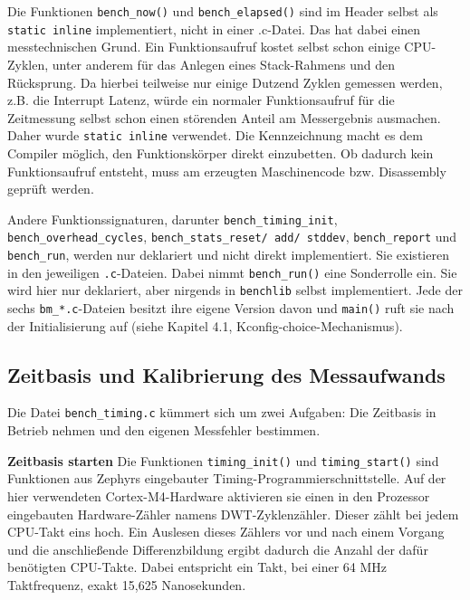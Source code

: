 Die Funktionen \lstinline[style=codeinline]|bench_now()| und \lstinline[style=codeinline]|bench_elapsed()| sind im Header selbst als \lstinline[style=codeinline]|static inline| implementiert, nicht in einer .c-Datei. Das hat dabei einen messtechnischen Grund. Ein Funktionsaufruf kostet selbst schon einige CPU-Zyklen, unter anderem f{\"u}r das Anlegen eines Stack-Rahmens und den R{\"u}cksprung. Da hierbei teilweise nur einige Dutzend Zyklen gemessen werden, z.B. die Interrupt Latenz, w{\"u}rde ein normaler Funktionsaufruf f{\"u}r die Zeitmessung selbst schon einen st{\"o}renden Anteil am Messergebnis ausmachen. Daher wurde \lstinline[style=codeinline]|static inline| verwendet. Die Kennzeichnung macht es dem Compiler m{\"o}glich, den Funktionsk{\"o}rper direkt einzubetten. Ob dadurch kein Funktionsaufruf entsteht, muss am erzeugten Maschinencode bzw. Disassembly gepr{\"u}ft werden.

Andere Funktionssignaturen, darunter \lstinline[style=codeinline]|bench_timing_init|, \lstinline[style=codeinline]|bench_overhead_cycles|, \lstinline[style=codeinline]|bench_stats_reset/ add/ stddev|, \lstinline[style=codeinline]|bench_report| und \lstinline[style=codeinline]|bench_run|, werden nur deklariert und nicht direkt implementiert. Sie existieren in den jeweiligen \lstinline[style=codeinline]|.c|-Dateien. Dabei nimmt \lstinline[style=codeinline]|bench_run()| eine Sonderrolle ein. Sie wird hier nur deklariert, aber nirgends in \lstinline[style=codeinline]|benchlib| selbst implementiert. Jede der sechs \lstinline[style=codeinline]|bm_*.c|-Dateien besitzt ihre eigene Version davon und \lstinline[style=codeinline]|main()| ruft sie nach der Initialisierung auf (siehe Kapitel 4.1, Kconfig-choice-Mechanismus).

\subsection{Zeitbasis und Kalibrierung des Messaufwands}
Die Datei \lstinline[style=codeinline]|bench_timing.c| k{\"u}mmert sich um zwei Aufgaben: Die Zeitbasis in Betrieb nehmen und den eigenen Messfehler bestimmen.

\textbf{Zeitbasis starten }Die Funktionen \lstinline[style=codeinline]|timing_init()| und \lstinline[style=codeinline]|timing_start()| sind Funktionen aus Zephyrs eingebauter Timing-Programmierschnittstelle. Auf der hier verwendeten Cortex-M4-Hardware aktivieren sie einen in den Prozessor eingebauten Hardware-Z{\"a}hler namens DWT-Zyklenz{\"a}hler. Dieser z{\"a}hlt bei jedem CPU-Takt eins hoch. Ein Auslesen dieses Z{\"a}hlers vor und nach einem Vorgang und die anschlie{\ss}ende Differenzbildung ergibt dadurch die Anzahl der daf{\"u}r ben{\"o}tigten CPU-Takte. Dabei entspricht ein Takt, bei einer 64 MHz Taktfrequenz, exakt 15,625 Nanosekunden.

